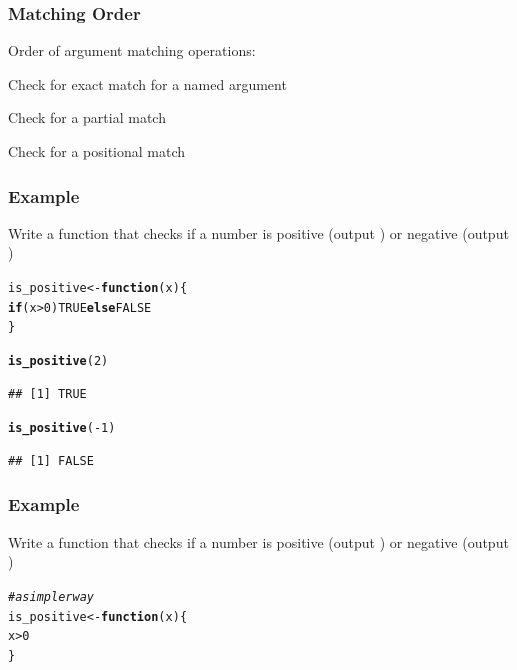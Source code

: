 \documentclass[12pt]{beamer}\usepackage[]{graphicx}\usepackage[]{color}
\makeatletter
\newcommand{\hlnum}[1]{\textcolor[rgb]{0.686,0.059,0.569}{#1}}%
\newcommand{\hlcom}[1]{\textcolor[rgb]{0.678,0.584,0.686}{\textit{#1}}}%
\newcommand{\hlopt}[1]{\textcolor[rgb]{0,0,0}{#1}}%
\newcommand{\hlstd}[1]{\textcolor[rgb]{0.345,0.345,0.345}{#1}}%
\newcommand{\hlkwa}[1]{\textcolor[rgb]{0.161,0.373,0.58}{\textbf{#1}}}%
\newcommand{\hlkwb}[1]{\textcolor[rgb]{0.69,0.353,0.396}{#1}}%
\newcommand{\hlkwc}[1]{\textcolor[rgb]{0.333,0.667,0.333}{#1}}%
\newcommand{\hlkwd}[1]{\textcolor[rgb]{0.737,0.353,0.396}{\textbf{#1}}}%
\newenvironment{kframe}{%
 \def\at@end@of@kframe{}%
 \ifinner\ifhmode%
  \def\at@end@of@kframe{\end{minipage}}%
  \begin{minipage}{\columnwidth}%
 \fi\fi%
 \def\FrameCommand##1{\hskip\@totalleftmargin \hskip-\fboxsep
 \colorbox{shadecolor}{##1}\hskip-\fboxsep
     \hskip-\linewidth \hskip-\@totalleftmargin \hskip\columnwidth}%
 \MakeFramed {\advance\hsize-\width
   \@totalleftmargin\z@ \linewidth\hsize
   \@setminipage}}%
 {\par\unskip\endMakeFramed%
 \at@end@of@kframe}
\newenvironment{knitrout}{}{} %
\makeatother
\begin{document}

\begin{frame}[fragile]
\frametitle{Matching Order}

Order of argument matching operations:
\bbi
  \item Check for exact match for a named argument
  \item Check for a partial match
  \item Check for a positional match
\ei

\end{frame}


\begin{frame}[fragile]
\frametitle{Example}

Write a function that checks if a number is positive (output ) or negative (output )
\pause
\begin{knitrout}\footnotesize
{}\color{fgcolor}\begin{kframe}
\begin{alltt}
\hlstd{is_positive} \hlkwb{<-} \hlkwa{function}\hlstd{(}\hlkwc{x}\hlstd{) \{}
  \hlkwa{if} \hlstd{(x} \hlopt{>} \hlnum{0}\hlstd{)} \hlnum{TRUE} \hlkwa{else} \hlnum{FALSE}
\hlstd{\}}

\hlkwd{is_positive}\hlstd{(}\hlnum{2}\hlstd{)}
\end{alltt}
\begin{verbatim}
## [1] TRUE
\end{verbatim}
\begin{alltt}
\hlkwd{is_positive}\hlstd{(}\hlopt{-}\hlnum{1}\hlstd{)}
\end{alltt}
\begin{verbatim}
## [1] FALSE
\end{verbatim}
\end{kframe}
\end{knitrout}

\end{frame}


\begin{frame}[fragile]
\frametitle{Example}

Write a function that checks if a number is positive (output ) or negative (output )

\begin{knitrout}\footnotesize
{}\color{fgcolor}\begin{kframe}
\begin{alltt}
\hlcom{# a simpler way}
\hlstd{is_positive} \hlkwb{<-} \hlkwa{function}\hlstd{(}\hlkwc{x}\hlstd{) \{}
  \hlstd{x} \hlopt{>} \hlnum{0}
\hlstd{\}}
\end{alltt}
\end{kframe}
\end{knitrout}

\end{frame}
\end{document}
